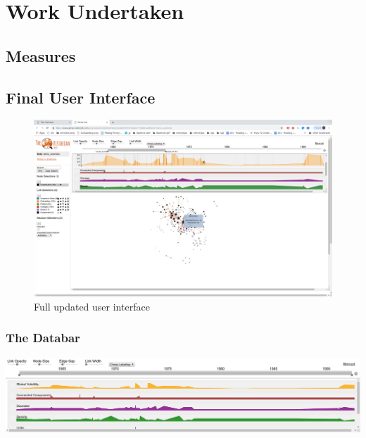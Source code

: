 
\chapter{Work Undertaken}

\section*{Measures}

\section{Final User Interface}

\begin{figure}[h!]
  \begin{center}
  \includegraphics[trim={0, 0, 0, 3.5cm}, clip, width=140mm]{./Figures/vistorianNewFull.png}
  \caption{Full updated user interface}
  \label{fig:vistorianNewFull}
  \end{center}
\end{figure}

\subsection{The Databar}

\begin{center}
\includegraphics[trim={0 0 0 0}, width=140mm]{./Figures/databar.png}
\end{center}

